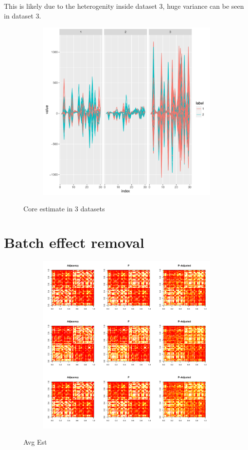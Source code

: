 \documentclass[12pt]{article}
\newcommand{\bfi}{\begin{figure}[H]}
\newcommand{\efi}{\end{figure}}
\newcommand{\bsfi}{\begin{subfigure}[t]}
\newcommand{\esfi}{\end{subfigure}}
\begin{document}
This is likely due to the heterogenity inside dataset 3, huge variance can be seen in dataset 3.

\bfi
\centering
\bsfi{1\columnwidth}
\includegraphics[width=.5\columnwidth]{../BatchEffectRemoval/core}
\esfi
\caption{Core estimate in 3 datasets}
\efi

\section{Batch effect removal}


\bfi
\centering
\bsfi{1\columnwidth}
\includegraphics[width=1\columnwidth]{../BatchEffectRemoval/fitted_dataset.pdf}
\esfi
\caption{Avg Est}
\efi
\end{document}
